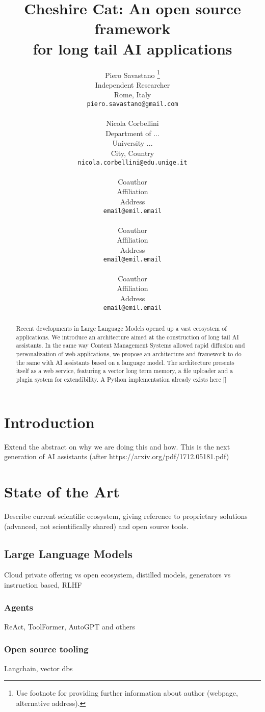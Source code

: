 \documentclass{article}
\title{Cheshire Cat: An open source framework\\for long tail AI applications}
\author{

Piero Savastano \thanks{Use footnote for providing further information about author (webpage, alternative address).} \\
Independent Researcher\\
Rome, Italy\\
\texttt{piero.savastano@gmail.com}\\
	
\And
	
Nicola Corbellini \\
Department of ...\\
University ...\\
City, Country \\
\texttt{nicola.corbellini@edu.unige.it} \\

\And

Coauthor \\
Affiliation \\
Address \\
\texttt{email@emil.email} \\

\And

Coauthor \\
Affiliation \\
Address \\
\texttt{email@emil.email} \\

\And

Coauthor \\
Affiliation \\
Address \\
\texttt{email@emil.email} \\
	
}
\begin{document}
\maketitle

\begin{abstract}
Recent developments in Large Language Models opened up a vast ecosystem of applications. We introduce an architecture aimed at the construction of long tail AI assistants. In the same way Content Management Systems allowed rapid diffusion and personalization of web applications, we propose an architecture and framework to do the same with AI assistants based on a language model. The architecture presents itself as a web service, featuring a vector long term memory, a file uploader and a plugin system for extendibility.
A Python implementation already exists here []
\end{abstract}




\section{Introduction}
Extend the abstract on why we are doing this and how.
This is the next generation of AI assistants (after https://arxiv.org/pdf/1712.05181.pdf)


\section{State of the Art}
Describe current scientific ecosystem, giving reference to proprietary solutions (advanced, not scientifically shared) and open source tools.

\subsection{Large Language Models}
Cloud private offering vs open ecosystem, distilled models, generators vs instruction based, RLHF

\subsubsection{Agents}
ReAct, ToolFormer, AutoGPT and others

\subsubsection{Open source tooling}
Langchain, vector dbs
\end{document}
